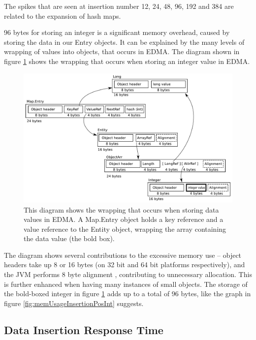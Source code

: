 The spikes that are seen at insertion number 12, 24, 48, 96, 192 and
384 are related to the expansion of hash maps.

96 bytes for storing an integer is a significant memory overhead,
caused by storing the data in our Entry objects. It can be explained
by the many levels of wrapping of values into objects, that occurs
in EDMA. The diagram shown in figure \ref{fig:valueStorageOverhead}
shows the wrapping that occurs when storing an integer value in EDMA.

\begin{figure}[h!]
\centering
\includegraphics[width=\textwidth]{img/valueStorage.pdf}
\caption{This diagram shows the wrapping that occurs when storing data values in EDMA. A Map.Entry object holds a key reference and a value reference to the Entity object, wrapping the array containing the data value (the bold box).}
\label{fig:valueStorageOverhead}
\end{figure}

The diagram shows several contributions to the excessive memory use
-- object headers take up 8 or 16 bytes (on 32 bit and 64 bit platforms
respectively), and the JVM performs 8 byte alignment \cite{dieckmann1999study},
contributing to unnecessary allocation. This is further enhanced when
having many instances of small objects. The storage of the bold-boxed
integer in figure \ref{fig:valueStorageOverhead} adds up to a total
of 96 bytes, like the graph in figure \ref{fig:memUsageInsertionPosInt}
suggests.


\subsection{Data Insertion Response Time}

